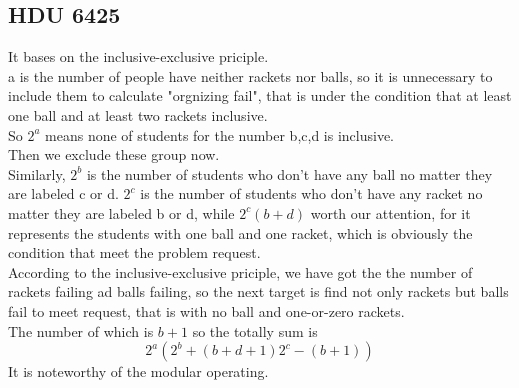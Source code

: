 \documentclass{article}
\begin{document}
    \subsection{\LARGE HDU 6425}
    It bases on the inclusive-exclusive priciple.\\
    a is the number of people have neither rackets nor balls, so it is unnecessary to include them to calculate "orgnizing fail", that is under the condition that at least one ball and at least two rackets inclusive.\\
    So $2^a$ means none of students for the number b,c,d is inclusive.\\
    Then we exclude these group now.\\
    Similarly, $2^b$ is the number of students who don't have any ball no matter they are labeled c or d. $2^c$ is the number of students who don't have any racket no matter they are labeled b or d, while $2^c(b+d)$ worth our attention, for it represents the students with one ball and one racket, which is obviously the condition that meet the problem request.\\
    According to the inclusive-exclusive priciple, we have got the the number of rackets failing ad balls failing, so the next target is find not only rackets but balls fail to meet request, that is with no ball and one-or-zero rackets.\\
    The number of which is $b+1$
    so the totally sum is
    \[2^a(2^b + (b+d+1)2^c - (b+1))\]
    It is noteworthy of the modular operating.
\end{document}
